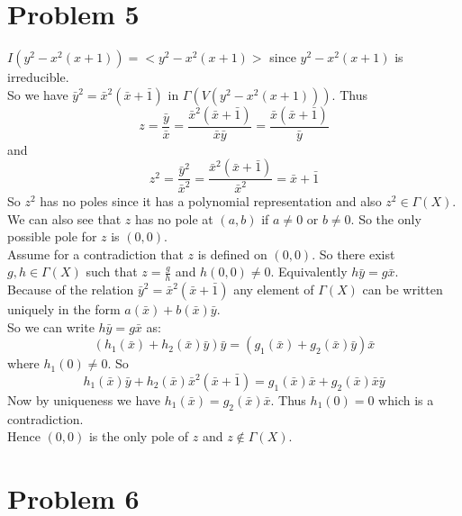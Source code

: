 \documentclass[12pt]{article}
\begin{document}
\clearpage
\section*{Problem 5}
$I(y^2-x^2(x+1))=<y^2-x^2(x+1)>$ since $y^2-x^2(x+1)$ is irreducible.\\ 
So we have
$\bar{y}^2=\bar{x}^2(\bar{x}+\bar{1})$ in $\Gamma (V(y^2-x^2(x+1)))$. Thus\\
$$z=\frac{\bar{y}}{\bar{x}}=
\frac{\bar{x}^2(\bar{x}+\bar{1})}{\bar{x}\bar{y}}
=\frac{\bar{x}(\bar{x}+\bar{1})}{\bar{y}}$$
and
$$z^2=\frac{\bar{y}^2}{\bar{x}^2}
= \frac{\bar{x}^2(\bar{x}+\bar{1})}{\bar{x}^2}
=\bar{x}+\bar{1}$$
So $z^2$ has no poles since it has a polynomial representation and also $z^2 \in \Gamma(X)$.\\
We can also see that $z$ has no pole at $(a,b)$ if $a \not=0$ or $b \not=0$. So the only possible pole for $z$ is $(0,0)$. \\
Assume for a contradiction that $z$ is defined on $(0,0)$. So there exist $g,h \in \Gamma(X)$ such that $z=\frac{g}{h}$ and $h(0,0) \not=0$. Equivalently $h\bar{y}=g\bar{x}$. \\
Because of the relation $\bar{y}^2=\bar{x}^2(\bar{x}+\bar{1})$ any element
of $\Gamma(X)$ can be written uniquely in the form
$a(\bar{x})+b(\bar{x})\bar{y}$.\\
So we can write $h\bar{y}=g\bar{x}$ as:
$$(h_1(\bar{x})+h_2(\bar{x})\bar{y})\bar{y}=
(g_1(\bar{x})+g_2(\bar{x})\bar{y})\bar{x}$$
where $h_1(0) \not=0$. So
$$
h_1(\bar{x})\bar{y}+h_2(\bar{x})\bar{x}^2(\bar{x}+\bar{1})=
g_1(\bar{x})\bar{x}+g_2(\bar{x})\bar{x}\bar{y}
$$
Now by uniqueness we have $h_1(\bar{x})=g_2(\bar{x})\bar{x}$. Thus $h_1(0)=0$ which is a contradiction. \\
Hence $(0,0)$ is the only pole of $z$ and $z \not\in \Gamma(X)$.

\clearpage
\section*{Problem 6}
\end{document}
